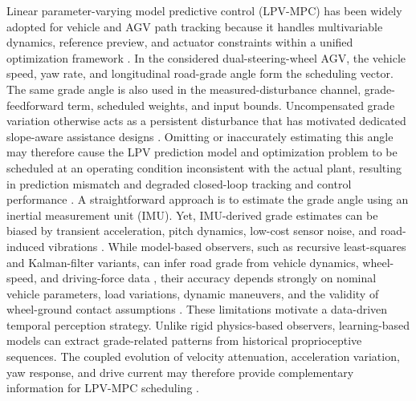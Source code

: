 \documentclass{ieeeaccess}
\newcommand{\citep}[1]{\cite{#1}}
\begin{document}
Linear parameter-varying model predictive control (LPV-MPC) has been widely adopted for vehicle and AGV path tracking because it handles multivariable dynamics, reference preview, and actuator constraints within a unified optimization framework \citep{Manikandan2022CurveAwareMPCAGV,Alcala2020AutonomousRacingLPVMPC,Kedir2024PSOLPVMPC,Domina2022LTVMPC}. In the considered dual-steering-wheel AGV, the vehicle speed, yaw rate, and longitudinal road-grade angle form the scheduling vector. The same grade angle is also used in the measured-disturbance channel, grade-feedforward term, scheduled weights, and input bounds. Uncompensated grade variation otherwise acts as a persistent disturbance that has motivated dedicated slope-aware assistance designs \citep{Luo2015DownhillAssist}. Omitting or inaccurately estimating this angle may therefore cause the LPV prediction model and optimization problem to be scheduled at an operating condition inconsistent with the actual plant, resulting in prediction mismatch and degraded closed-loop tracking and control performance \citep{Sato2013InexactScheduling,Pan2022InexactSchedulingLPV,Metzler2021PredictionFidelity,Lin2019AdaptiveMPCPathTracking}. A straightforward approach is to estimate the grade angle using an inertial measurement unit (IMU). Yet, IMU-derived grade estimates can be biased by transient acceleration, pitch dynamics, low-cost sensor noise, and road-induced vibrations \citep{Jauch2018IMUGradeOrientation,Liu2023RoadSlopeAAIMM,Gao2024RoadSlopeHDV}. While model-based observers, such as recursive least-squares and Kalman-filter variants, can infer road grade from vehicle dynamics, wheel-speed, and driving-force data \citep{Jiang2019AdaptiveSlopeMass,Guo2022SageHusaAKF}, their accuracy depends strongly on nominal vehicle parameters, load variations, dynamic maneuvers, and the validity of wheel-ground contact assumptions \citep{Gao2024RoadSlopeHDV}. These limitations motivate a data-driven temporal perception strategy. Unlike rigid physics-based observers, learning-based models can extract grade-related patterns from historical proprioceptive sequences. The coupled evolution of velocity attenuation, acceleration variation, yaw response, and drive current may therefore provide complementary information for LPV-MPC scheduling \citep{Liang2022LSTMRoadID}.
\end{document}
